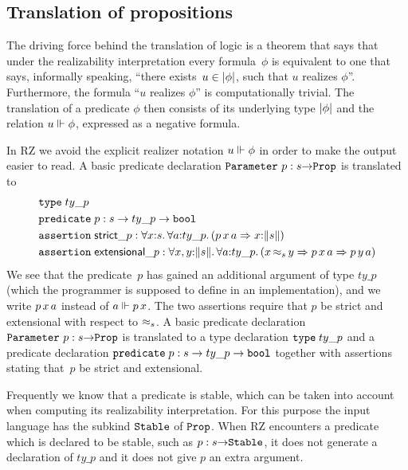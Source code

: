 \subsection{Translation of propositions}
\label{sec:transl-prop}

The driving force behind the translation of logic is a theorem
\cite[4.4.10]{Troelstra:van-Dalen:88:1} that says that under the
realizability interpretation every formula~$\phi$ is equivalent to one
that says, informally speaking, ``there exists~$u \in |\phi|$,
such that $u$ realizes $\phi$''. Furthermore, the formula ``$u$
realizes $\phi$'' is computationally trivial. The translation of a
predicate $\phi$ then consists of its underlying type $|\phi|$
and the relation $u \Vdash \phi$, expressed as a negative formula.

In RZ we avoid the explicit realizer notation $u \Vdash \phi$ in order to
make the output easier to read.
%
\iflong
%
A basic predicate declaration $\mathtt{Parameter}\ p : s{\to}\mathtt{Prop}$ is
translated to
%
\begin{align*}
  & \otyspec{ty\_p} \\
  & \opropspec{p}{s \to ty\_p \to \oProp} \\
  & \oassertion{\mathsf{strict}\_p}{
    \oforall{x}{s}{
      \oforall{a}{ty\_p}{
        (\oimply
        {\oapp{\oapp{p}{x}}{a}}
        {\ototal{x}{s}
        })
      }
    }
  } \\
  & \oassertion{\mathsf{extensional}\_p}{
    \oforallt{x,y}{s}{
      \oforall{a}{ty\_p}{
          (\oimply{\oper{s}{x}{y}}
          {\oimply{\oapp{\oapp{p}{x}}{a}}{\oapp{\oapp{p}{y}}{a}}})
          }}}
\end{align*}
%
We see that the predicate~$p$ has gained an additional argument of
type $ty\_p$ (which the programmer is supposed to define in an
implementation), and we write $p\,x\,a$ instead of $a
\Vdash p\,x$. The two assertions require that $p$ be strict and
extensional with respect to $\approx_s$.
%
\else %
%
A basic predicate declaration $\mathtt{Parameter}\ p : s{\to}\mathtt{Prop}$ is
translated to a type declaration $\mathtt{type}\;ty\_p$ and a predicate
declaration $\mathtt{predicate}\; p:s \to ty\_p \to \mathtt{bool}$ together with
assertions stating that~$p$ be strict and extensional.
%
\fi %

Frequently we know that a predicate is stable, which can be taken into
account when computing its realizability interpretation. For this
purpose the input language has the subkind $\mathtt{Stable}$ of $\mathtt{Prop}$.
When RZ encounters a predicate which is declared to be stable, such as
$p : s{\to}\mathtt{Stable}$, it does not generate a declaration of
$ty\_p$ and it does not give $p$ an extra argument.


